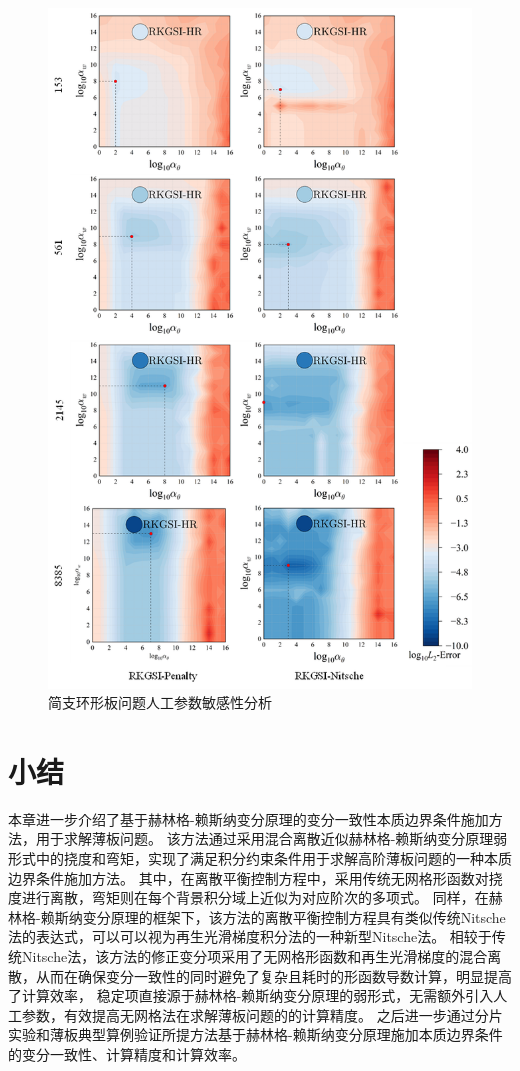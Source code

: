\begin{figure}[H]
    \centering
    \includegraphics[scale=1.1]{figure/PHR/A/alpha.png}
    \caption{简支环形板问题人工参数敏感性分析}\label{Aalpha}
\end{figure}
\section{小结}
本章进一步介绍了基于赫林格-赖斯纳变分原理的变分一致性本质边界条件施加方法，用于求解薄板问题。
该方法通过采用混合离散近似赫林格-赖斯纳变分原理弱形式中的挠度和弯矩，实现了满足积分约束条件用于求解高阶薄板问题的一种本质边界条件施加方法。
其中，在离散平衡控制方程中，采用传统无网格形函数对挠度进行离散，弯矩则在每个背景积分域上近似为对应阶次的多项式。
同样，在赫林格-赖斯纳变分原理的框架下，该方法的离散平衡控制方程具有类似传统Nitsche法的表达式，可以可以视为再生光滑梯度积分法的一种新型Nitsche法。
相较于传统Nitsche法，该方法的修正变分项采用了无网格形函数和再生光滑梯度的混合离散，从而在确保变分一致性的同时避免了复杂且耗时的形函数导数计算，明显提高了计算效率，
稳定项直接源于赫林格-赖斯纳变分原理的弱形式，无需额外引入人工参数，有效提高无网格法在求解薄板问题的的计算精度。
之后进一步通过分片实验和薄板典型算例验证所提方法基于赫林格-赖斯纳变分原理施加本质边界条件的变分一致性、计算精度和计算效率。





